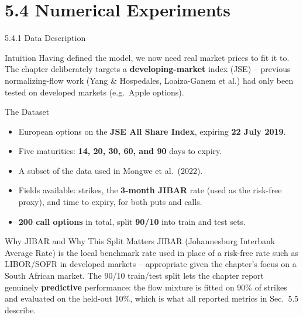 \documentclass[aspectratio=169,10pt]{beamer}
\begin{document}
\section{5.4 Numerical Experiments}
\begin{frame}[allowframebreaks]{5.4.1 Data Description}

\begin{block}{Intuition}
Having defined the model, we now need real market prices to fit it to. The
chapter deliberately targets a \textbf{developing-market} index (JSE) --
previous normalizing-flow work (Yang \& Hospedales, Loaiza-Ganem et al.) had
only been tested on developed markets (e.g.\ Apple options).
\end{block}

\begin{block}{The Dataset}
\begin{itemize}
  \item European options on the \textbf{JSE All Share Index}, expiring
  \textbf{22 July 2019}.
  \item Five maturities: \textbf{14, 20, 30, 60, and 90} days to expiry.
  \item A subset of the data used in Mongwe et al.\ (2022).
  \item Fields available: strikes, the \textbf{3-month JIBAR} rate (used as
  the risk-free proxy), and time to expiry, for both puts and calls.
  \item \textbf{200 call options} in total, split \textbf{90/10} into
  train and test sets.
\end{itemize}
\end{block}

\framebreak

\begin{block}{Why JIBAR and Why This Split Matters}
JIBAR (Johannesburg Interbank Average Rate) is the local benchmark rate
used in place of a risk-free rate such as LIBOR/SOFR in developed markets --
appropriate given the chapter's focus on a South African market. The
90/10 train/test split lets the chapter report genuinely \textbf{predictive}
performance: the flow mixture is fitted on 90\% of strikes and evaluated
on the held-out 10\%, which is what all reported metrics in Sec.~5.5
describe.
\end{block}

\end{frame}
\end{document}

